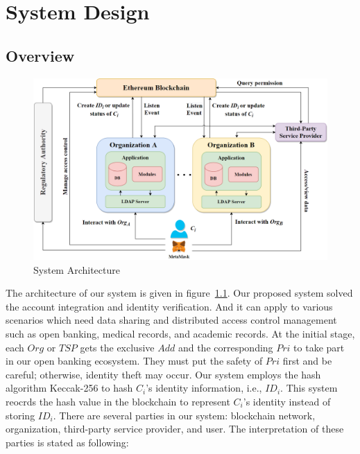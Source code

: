 \chapter{System Design}
\label{chapter:design}

\section{Overview}
    
    \newpage    

    \begin{figure}[htb]
        \centering
        \includegraphics[height=!,width=1\linewidth,keepaspectratio=true]{figures/system_architecture.png}
        \caption{{\footnotesize System Architecture}}
        \label{fig:system_architecture}
    \end{figure}
    The architecture of our system is given in figure~\ref{fig:system_architecture}. Our proposed system solved the account integration and identity verification. And it can apply to various scenarios which need data sharing and distributed access control management such as open banking, medical records, and academic records. At the initial stage, each \(Org\) or \(TSP\) gets the exclusive \(Add\) and the corresponding \(Pri\) to take part in our open banking ecosystem. They must put the safety of \(Pri\) first and be careful; otherwise, identity theft may occur. Our system employs the hash algorithm Keccak-256 to hash \(C_i\)'s identity information, i.e., \(ID_i\). This system reocrds the hash value in the blockchain to represent \(C_i\)'s identity instead of storing \(ID_i\). There are several parties in our system: blockchain network, organization, third-party service provider, and user. The interpretation of these parties is stated as following:\par

